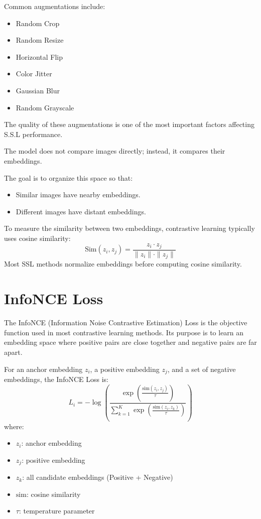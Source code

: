 Common augmentations include:
\begin{itemize}
    \item Random Crop
    \item Random Resize
    \item Horizontal Flip
    \item Color Jitter
    \item Gaussian Blur
    \item Random Grayscale
\end{itemize}

The quality of these augmentations is one of the most important factors affecting S.S.L performance.

The model does not compare images directly; instead, it compares their embeddings.

The goal is to organize this space so that:
\begin{itemize}
    \item Similar images have nearby embeddings.
    \item Different images have distant embeddings.
\end{itemize}

To measure the similarity between two embeddings, contrastive learning typically uses cosine similarity:
\[
\text{Sim}(z_i, z_j) = \frac{z_i \cdot z_j}{\|z_i\| \cdot \|z_j\|}
\]
Most SSL methods normalize embeddings before computing cosine similarity.

\section{InfoNCE Loss}

The InfoNCE (Information Noise Contrastive Estimation) Loss is the objective function used in most contrastive learning methods. Its purpose is to learn an embedding space where positive pairs are close together and negative pairs are far apart.

For an anchor embedding $z_i$, a positive embedding $z_j$, and a set of negative embeddings, the InfoNCE Loss is:
\[
L_i = -\log \left( \frac{\exp\left( \frac{\text{sim}(z_i, z_j)}{\tau} \right)}{\sum_{k=1}^{K} \exp\left( \frac{\text{sim}(z_i, z_k)}{\tau} \right)} \right)
\]
where:
\begin{itemize}
    \item $z_i$: anchor embedding
    \item $z_j$: positive embedding
    \item $z_k$: all candidate embeddings (Positive + Negative)
    \item $\text{sim}$: cosine similarity
    \item $\tau$: temperature parameter
\end{itemize}

